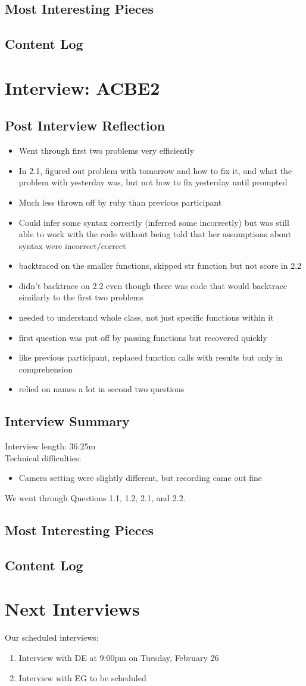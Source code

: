 \documentclass{article}
\begin{document}
\subsection{Most Interesting Pieces}
\subsection{Content Log}
\section{Interview: ACBE2}
\subsection{Post Interview Reflection}
\begin{itemize}
  \item Went through first two problems very efficiently
  \item In 2.1, figured out problem with tomorrow and how to fix it, and what the problem with yesterday was, but not how to fix yesterday until prompted
  \item Much less thrown off by ruby than previous participant
  \item Could infer some syntax correctly (inferred some incorrectly) but was still able to work with the code without being told that her assumptions about syntax were incorrect/correct
  \item backtraced on the smaller functions, skipped str function but not score in 2.2
  \item didn't backtrace on 2.2 even though there was code that would backtrace similarly to the first two problems
  \item needed to understand whole class, not just specific functions within it
  \item first question was put off by passing functions but recovered quickly
  \item like previous participant, replaced function calls with results but only in comprehension
  \item relied on names a lot in second two questions
\end{itemize}
\subsection{Interview Summary}
Interview length: 36:25m \\
Technical difficulties:
\begin{itemize}
  \item Camera setting were slightly different, but recording came out fine
\end{itemize}
We went through Questions 1.1, 1.2, 2.1, and 2.2.
\subsection{Most Interesting Pieces}
\subsection{Content Log}
\section{Next Interviews}
Our scheduled interviews:
\begin{enumerate}
  \item Interview with DE at 9:00pm on Tuesday, February 26
  \item Interview with EG to be scheduled
\end{enumerate}
\end{document}
